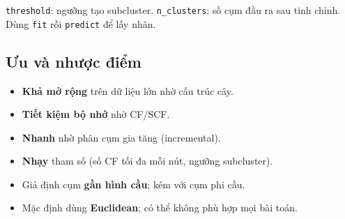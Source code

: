 \begin{ynghia}[title={Tham số}]
\texttt{threshold}: ngưỡng tạo subcluster.
\texttt{n\_clusters}: số cụm đầu ra sau tinh chỉnh.
Dùng \texttt{fit} rồi \texttt{predict} để lấy nhãn.
\end{ynghia}


\subsection{Ưu và nhược điểm}

\begin{tinhchat}[title={Ưu điểm}]
\begin{itemize}
  \item \textbf{Khả mở rộng} trên dữ liệu lớn nhờ cấu trúc cây.
  \item \textbf{Tiết kiệm bộ nhớ} nhờ CF/SCF.
  \item \textbf{Nhanh} nhờ phân cụm gia tăng (incremental).
\end{itemize}
\end{tinhchat}

\begin{luuy}[title={Nhược điểm}]
\begin{itemize}
  \item \textbf{Nhạy} tham số (số CF tối đa mỗi nút, ngưỡng subcluster).
  \item Giả định cụm \textbf{gần hình cầu}; kém với cụm phi cầu.
  \item Mặc định dùng \textbf{Euclidean}; có thể không phù hợp mọi bài toán.
\end{itemize}
\end{luuy}
